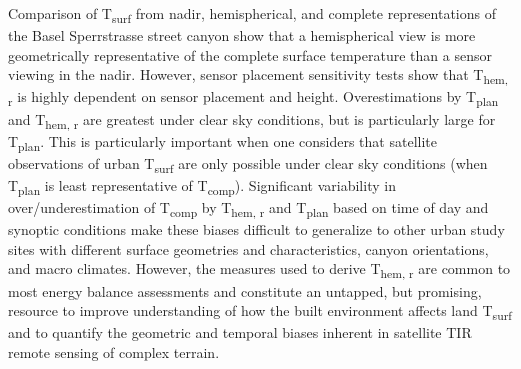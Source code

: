 Comparison of T\textsubscript{surf} from nadir, hemispherical, and complete representations of the Basel Sperrstrasse street canyon show that a hemispherical view is more geometrically representative of the complete surface temperature than a sensor viewing in the nadir. However, sensor placement sensitivity tests show that T\textsubscript{hem, r} is highly dependent on sensor placement and height. Overestimations by T\textsubscript{plan} and T\textsubscript{hem, r} are greatest under clear sky conditions, but is particularly large for T\textsubscript{plan}. This is particularly important when one considers that satellite observations of urban T\textsubscript{surf} are only possible under clear sky conditions (when T\textsubscript{plan} is least representative of T\textsubscript{comp}). Significant variability in over/underestimation of T\textsubscript{comp} by T\textsubscript{hem, r} and T\textsubscript{plan} based on time of day and synoptic conditions make these biases difficult to generalize to other urban study sites with different surface geometries and characteristics, canyon orientations, and macro climates. However, the measures used to derive T\textsubscript{hem, r} are common to most energy balance assessments and constitute an untapped, but promising, resource to improve understanding of how the built environment affects land T\textsubscript{surf} and to quantify the geometric and temporal biases inherent in satellite TIR remote sensing of complex terrain. 
